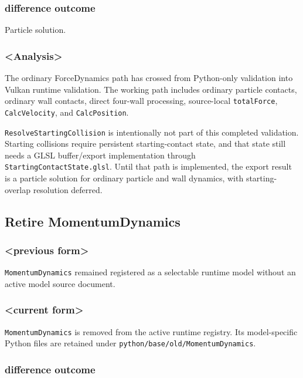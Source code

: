 \subsubsection{difference outcome}

Particle solution.

\subsubsection{<Analysis>}

The ordinary ForceDynamics path has crossed from Python-only validation into
Vulkan runtime validation.  The working path includes ordinary particle
contacts, ordinary wall contacts, direct four-wall processing, source-local
\texttt{totalForce}, \texttt{CalcVelocity}, and \texttt{CalcPosition}.

\texttt{ResolveStartingCollision} is intentionally not part of this completed
validation.  Starting collisions require persistent starting-contact state,
and that state still needs a GLSL buffer/export implementation through
\texttt{StartingContactState.glsl}.  Until that path is implemented, the
export result is a particle solution for ordinary particle and wall dynamics,
with starting-overlap resolution deferred.

\subsection{Retire MomentumDynamics}

\subsubsection{<previous form>}

\texttt{MomentumDynamics} remained registered as a selectable runtime model
without an active model source document.

\subsubsection{<current form>}

\texttt{MomentumDynamics} is removed from the active runtime registry.  Its
model-specific Python files are retained under
\texttt{python/base/old/MomentumDynamics}.

\subsubsection{difference outcome}

